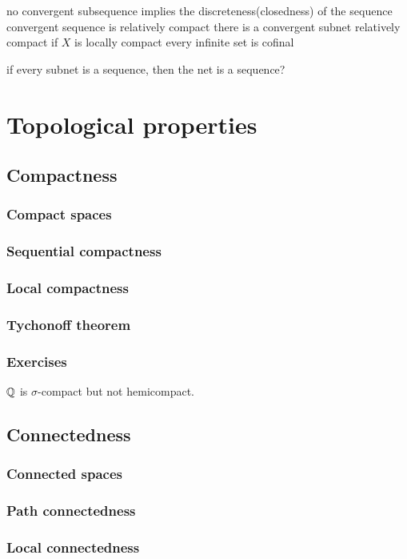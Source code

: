 \documentclass{../note}
\begin{document}
no convergent subsequence implies the discreteness(closedness) of the sequence
convergent sequence is relatively compact
there is a convergent subnet relatively compact if $X$ is locally compact
every infinite set is cofinal


if every subnet is a sequence, then the net is a sequence?


\part{Topological properties}
\chapter{Compactness}
\section{Compact spaces}
\section{Sequential compactness}
\section{Local compactness}
\section{Tychonoff theorem}
\section*{Exercises}
\begin{prb}
$\mathbb{Q}$ is $\sigma$-compact but not hemicompact.
\end{prb}
\chapter{Connectedness}
\section{Connected spaces}
\section{Path connectedness}
\section{Local connectedness}
\end{document}

